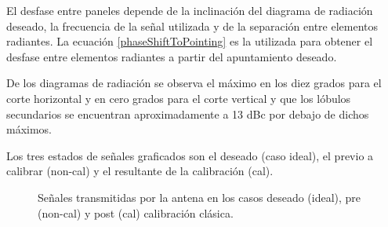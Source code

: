 El desfase entre paneles depende de la inclinación del diagrama de radiación deseado, la frecuencia de la señal utilizada y de la
separación entre elementos radiantes. La ecuación \ref{phaseShiftToPointing} es la utilizada para obtener el desfase entre 
elementos radiantes a partir del apuntamiento deseado.


De los diagramas de radiación se observa el máximo en los diez grados para el corte horizontal y en cero grados para el corte
vertical y que los lóbulos secundarios se encuentran aproximadamente a 13 dBc por debajo de dichos máximos.

Los tres estados de señales graficados son el deseado (caso ideal), el previo a calibrar (non-cal) y el resultante de la
calibración (cal).

\begin{figure}[H]
	\centering

	\caption{Señales transmitidas por la antena en los casos deseado (ideal), pre (non-cal) y post (cal) calibración clásica.}
	\label{fig:nonErrClassical10degCol}
\end{figure}

